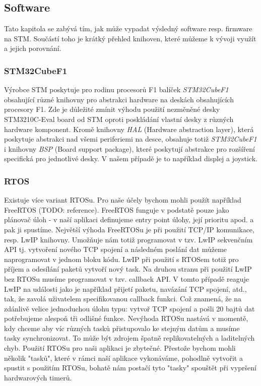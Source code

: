 \subsection{Software}
Tato kapitola se zabývá tím, jak může vypadat výsledný software resp. firmware na STM.
Součástí toho je krátký přehled knihoven, které můžeme k vývoji využít a jejich porovnání.

\subsubsection{STM32CubeF1}
Výrobce STM poskytuje pro rodinu procesorů F1 balíček \emph{STM32CubeF1} obsahující různé knihovny
pro abstrakci hardware na deskách obsahujících procesory F1.
Zde je důležité zmínit výhodu použití nezměněné desky STM3210C-Eval board od STM oproti poskládání
vlastní desky z různých hardware komponent.
Kromě knihovny \emph{HAL} (Hardware abstraction layer), která poskytuje abstrakci nad všemi
periferiemi na desce, obsahuje totiž \emph{STM32CubeF1} i knihovny \emph{BSP} (Board support package),
které poskytují abstrakce pro rozšíření specifická pro jednotlivé desky.
V našem případě je to například displej a joystick.

\subsubsection{RTOS}
Existuje více variant RTOSu.
Pro naše účely bychom mohli použít například FreeRTOS (TODO: reference).
FreeRTOS funguje v podstatě pouze jako plánovač úloh - v naší aplikaci definujeme entry point
úlohy, její prioritu apod. a pak ji spustíme.
Největší výhoda FreeRTOSu je při použití TCP/IP komunikace, resp. LwIP knihovny.
Umožňuje nám totiž programovat v tzv. LwIP sekvenčním API tj. vytvoření nového TCP spojení
a následném poslání dat můžeme naprogramovat v jednom bloku kódu.
LwIP při použití s RTOSem totiž pro příjem a odesílání paketů vytvoří nový task.
Na druhou stranu při použití LwIP bez RTOSu musíme programovat v tzv. callback API.
V tomto případě reaguje LwIP na události jako je například přijetí paketu, navázání TCP spojení, atd.,
tak, že zavolá uživatelem specifikovanou callback funkci.
Což znamená, že na zdánlivě velice jednoduchou úlohu typu: vytvoř TCP spojení a pošli 20 bajtů dat
potřebujeme alespoň tři odlišné funkce.
Nevýhoda RTOSu nastává v momentě, kdy chceme aby víc různých tasků přistupovalo ke stejným datům
a musíme tasky synchronizovat.
To může být zdrojem špatně replikovatelných a laditelných chyb.
Použití RTOSu pro naši aplikaci je zbytečné.
Přestože bychom mohli několik "tasků", které v rámci naší aplikace vykonáváme, pohodlně vytvořit
a spustit s použitím RTOSu, bohatě nám postačí tyto "tasky" spouštět při vypršení hardwarových
timerů.

